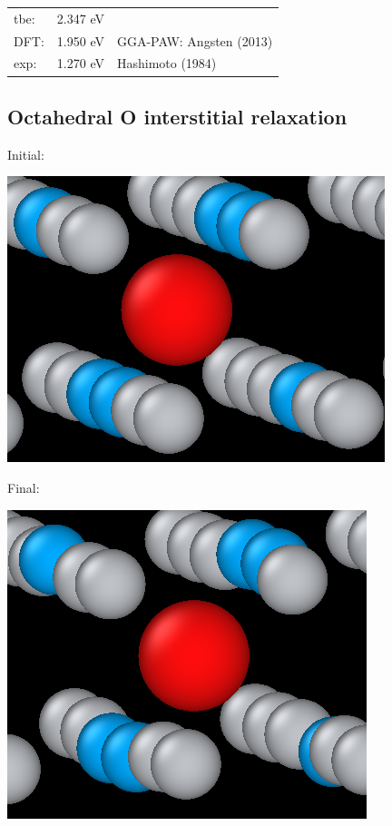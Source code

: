 \documentclass[11pt]{article}
\begin{document}
\begin{center}
\begin{tabular}{lll}
tbe: & 2.347  eV & \\
DFT: & 1.950  eV & GGA-PAW:   Angsten  (2013)\\
exp: & 1.270  eV & Hashimoto  (1984)\\
\end{tabular}
\end{center}

\subsection{Octahedral O interstitial relaxation}
\label{sec:org40d2f23}

Initial:
\begin{center}
\includegraphics[width=.9\linewidth]{Images/initial_octahedral_ox_ovito.png}
\end{center}

Final:
\begin{center}
\includegraphics[width=.9\linewidth]{Images/final_octahedral_ox_ovito.png}
\end{center}
\end{document}
